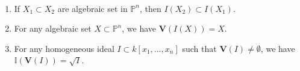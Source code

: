 \documentclass[crop=false,class=article,oneside]{standalone}
\begin{document}
            \begin{theorem}
                \
                \begin{enumerate}
                    \item If $X_1\subset X_2$ are algebraic
                          set in $\mathbb{P}^{n}$,
                          then $I(X_{2})\subset{I}(X_{1})$.
                    \item For any algebraic set
                          $X\subset\mathbb{P}^{n}$, we have
                          $\mathbf{V}(I(X))=X$.
                    \item For any homogeneous ideal
                          $I\subset{k}[x_{1},\hdots,x_{n}]$ such
                          that $\mathbf{V}(I)\ne\emptyset$,
                          we have
                          $\mathbb{I}(\mathbf{V}(I))=\sqrt{I}$.
                \end{enumerate}
            \end{theorem}
\end{document}
